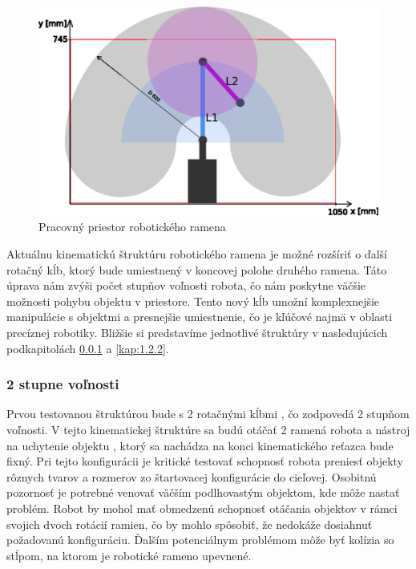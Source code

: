 \begin{figure}[]
	\centering
	\includegraphics[width=140mm]{img/SCARA-workspace.eps}
	\caption{Pracovný priestor robotického ramena}\label{OBRAZOK 123} 
\end{figure} 

Aktuálnu kinematickú štruktúru robotického ramena je možné rozšíriť o ďalší rotačný kĺb, ktorý bude umiestnený v koncovej polohe druhého ramena. Táto úprava nám zvýši počet stupňov voľnosti robota, čo nám poskytne väčšie možnosti pohybu objektu v priestore. Tento nový kĺb umožní komplexnejšie manipulácie s objektmi a presnejšie umiestnenie, čo je kľúčové najmä v oblasti precíznej robotiky. Bližšie si predstavíme jednotlivé štruktúry v nasledujúcich podkapitolách \ref{kap:1.2.1} a \ref{kap:1.2.2}.


\subsubsection{2 stupne voľnosti}
\label{kap:1.2.1}

Prvou testovanou štruktúrou bude s 2 rotačnými kĺbmi , čo zodpovedá 2 stupňom voľnosti. V tejto kinematickej štruktúre sa budú otáčať 2 ramená robota a nástroj na uchytenie objektu , ktorý sa nachádza na konci kinematického reťazca bude fixný.
Pri tejto konfigurácii je kritické testovať schopnosť robota preniesť objekty rôznych tvarov a rozmerov zo štartovacej konfigurácie do cieľovej. Osobitnú pozornosť je potrebné venovať väčším podlhovastým objektom, kde môže nastať problém. Robot by mohol mať obmedzenú schopnosť otáčania objektov v rámci svojich dvoch rotácií ramien, čo by mohlo spôsobiť, že nedokáže dosiahnuť požadovanú konfiguráciu. Ďalším potenciálnym problémom môže byť kolízia so stĺpom, na ktorom je robotické rameno upevnené.

